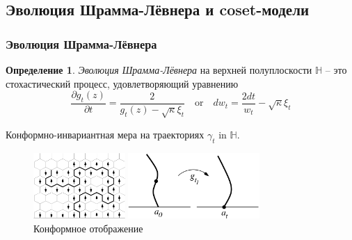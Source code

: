 \documentclass[pdftex]{beamer}
\theoremstyle{definition} \newtheorem{Def}{Определение}
\begin{document}
\subsection{Эволюция Шрамма-Лёвнера и coset-модели}
\label{sec:SLE}
\begin{frame}
  \frametitle{Эволюция Шрамма-Лёвнера}
  \begin{Def}
    {\it Эволюция Шрамма-Лёвнера} на верхней полуплоскости  $\mathbb{H}$ -- это стохастический процесс, удовлетворяющий уравнению
    \begin{equation*}
      \frac{\partial g_t(z)}{\partial t} = \frac{ 2}{g_t(z)-\sqrt{\kappa}\xi_{t}} \quad \text{or} \quad       d w _{t}= \frac{2dt}{w_{t} }-\sqrt{\kappa}\xi_{t}
    \end{equation*}
  \end{Def}
  Конформно-инвариантная мера на траекториях $\gamma_{t}$ in $\mathbb{H}$.
  \begin{figure}[h]
    \begin{multicols}{2}
      \hfill
      \includegraphics[height=25mm]{figures/explore.pdf}
      \vspace{-0.2cm}
      \caption{Эволюция Шрамма-Лёвнера -- непрерывный предел интерфейсов}
      \label{fig:sle}
      \hfill
      \includegraphics[width=50mm]{figures/loewner.pdf}
      \caption{Конформное отображение}
      \label{fig:sle}
    \end{multicols}

  \end{figure}
\end{frame}
\end{document}

